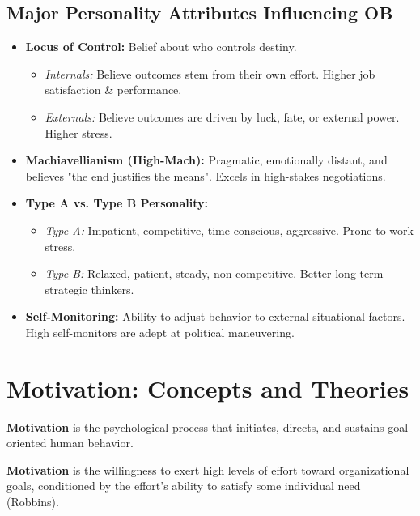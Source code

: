 \documentclass[12pt,a4paper]{article}
\begin{document}
\subsection{Major Personality Attributes Influencing OB}
\begin{itemize}[leftmargin=*, itemsep=4pt]
  \item \textbf{Locus of Control:} Belief about who controls destiny.
    \begin{itemize}[leftmargin=*, noitemsep]
      \item \textit{Internals:} Believe outcomes stem from their own effort. Higher job satisfaction \& performance.
      \item \textit{Externals:} Believe outcomes are driven by luck, fate, or external power. Higher stress.
    \end{itemize}
  \item \textbf{Machiavellianism (High-Mach):} Pragmatic, emotionally distant, and believes "the end justifies the means". Excels in high-stakes negotiations.
  \item \textbf{Type A vs. Type B Personality:}
    \begin{itemize}[leftmargin=*, noitemsep]
      \item \textit{Type A:} Impatient, competitive, time-conscious, aggressive. Prone to work stress.
      \item \textit{Type B:} Relaxed, patient, steady, non-competitive. Better long-term strategic thinkers.
    \end{itemize}
  \item \textbf{Self-Monitoring:} Ability to adjust behavior to external situational factors. High self-monitors are adept at political maneuvering.
\end{itemize}

\section{Motivation: Concepts and Theories}

\textbf{Motivation} is the psychological process that initiates, directs, and sustains goal-oriented human behavior.

\begin{tcolorbox}[defbox, title={Definition of Motivation}]
  \textbf{Motivation} is the willingness to exert high levels of effort toward organizational goals, conditioned by the effort's ability to satisfy some individual need (Robbins).
\end{tcolorbox}
\end{document}
